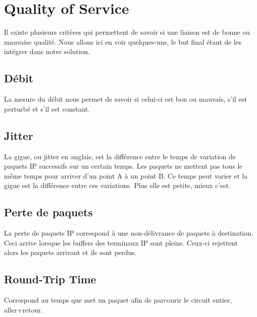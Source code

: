
\chapter{Quality of Service}

Il existe plusieurs critères qui permettent de savoir si une liaison est de bonne ou mauvaise qualité. Nous allons ici en voir quelques-uns, le but final étant de les intégrer dans notre solution.

\section{Débit}
La mesure du débit nous permet de savoir si celui-ci est bon ou mauvais, s'il est perturbé et s'il est constant.
\section{Jitter}
La gigue, ou jitter en anglais, est la différence entre le temps de variation de  paquets IP successifs sur un certain temps. Les paquets ne mettent pas tous le même temps pour arriver d'un point A à un point B. Ce temps peut varier et la gigue est la différence entre ces variations. Plus elle est petite, mieux c'est.
\section{Perte de paquets}
La perte de paquets IP correspond à une non-délivrance de paquets à destination. Ceci arrive lorsque les buffers des terminaux IP sont pleins. Ceux-ci rejettent alors les paquets arrivant et ils sont perdus.
\section{Round-Trip Time}
Correspond au temps que met un paquet afin de parcourir le circuit entier, aller+retour.

